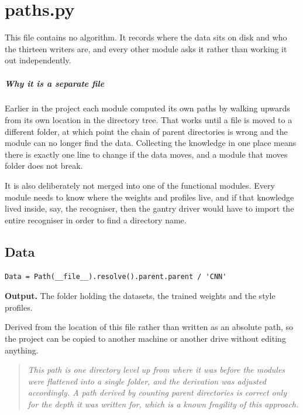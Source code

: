 
\chapter{paths.py}
This file contains no algorithm. It records where the data sits on disk and who the thirteen writers are, and every other module asks it rather than working it out independently.


\paragraph{Why it is a separate file}
Earlier in the project each module computed its own paths by walking upwards from its own location in the directory tree. That works until a file is moved to a different folder, at which point the chain of parent directories is wrong and the module can no longer find the data. Collecting the knowledge in one place means there is exactly one line to change if the data moves, and a module that moves folder does not break.

It is also deliberately not merged into one of the functional modules. Every module needs to know where the weights and profiles live, and if that knowledge lived inside, say, the recogniser, then the gantry driver would have to import the entire recogniser in order to find a directory name.


\section{Data}
\begin{lstlisting}[style=sig]
Data = Path(__file__).resolve().parent.parent / 'CNN'
\end{lstlisting}

\noindent\textbf{Output.} The folder holding the datasets, the trained weights and the style profiles.

Derived from the location of this file rather than written as an absolute path, so the project can be copied to another machine or another drive without editing anything.


\begin{quote}\small\itshape This path is one directory level up from where it was before the modules were flattened into a single folder, and the derivation was adjusted accordingly. A path derived by counting parent directories is correct only for the depth it was written for, which is a known fragility of this approach.\end{quote}

